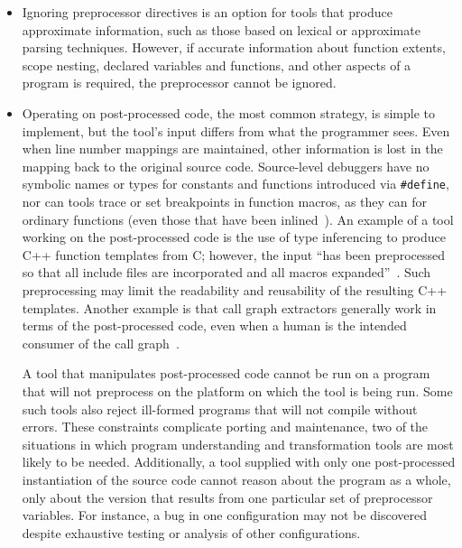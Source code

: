 \documentclass[10pt]{article}
\begin{document}
\begin{itemize}

\item Ignoring preprocessor directives is an option for tools that produce
  approximate information, such as those based on lexical or approximate
  parsing techniques.  However, if accurate information about function
  extents, scope nesting, declared variables and functions, and other
  aspects of a program is required, the preprocessor cannot be ignored.

\item Operating on post-processed code, the most common strategy, is
  simple to implement, but the tool's input differs from what the
  programmer sees.  Even when line number mappings are maintained,
  other information is lost in the mapping back to the original source
  code.  Source-level debuggers have no symbolic names or types for
  constants and functions introduced via {\tt \#define}, nor can tools
  trace or set breakpoints in function macros, as they can for
  ordinary functions (even those that have been
  inlined~\cite{Zellweger83:TR}).  An example of a tool working on the
  post-processed code is the use of type inferencing to produce C++
  function templates from C; however, the input ``has been
  preprocessed so that all include files are incorporated and all
  macros expanded''~\cite[p.~145]{Siff-fse96}.  Such preprocessing may
  limit the readability and reusability of the resulting C++
  templates.  Another example is that call graph extractors generally
  work in terms of the post-processed code, even when a human is the
  intended consumer of the call graph~\cite{Murphy-icse18}.


  A tool that manipulates post-processed code cannot be run on a
  program that will not preprocess on the platform on which the tool
  is being run.  Some such tools also reject ill-formed programs
  that will not compile without errors.  These constraints complicate
  porting and maintenance, two of the situations in which program
  understanding and transformation tools are most likely to be needed.
  Additionally, a tool supplied with only one post-processed
  instantiation of the source code cannot reason about the program as
  a whole, only about the version that results from one particular set
  of preprocessor variables.  For instance, a bug in one configuration
  may not be discovered despite exhaustive testing or analysis of
  other configurations.



  


\end{itemize}
\end{document}
